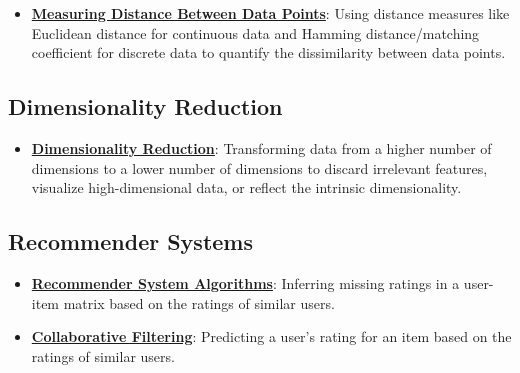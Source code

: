 \documentclass{article}%
\begin{document}
\begin{itemize}[leftmargin=*]
\item \href{https://purdue.brightspace.com/d2l/common/assets/pdfjs-d2l-dist/1.0.14-legacy/web/viewer.html?file=\%2Fcontent\%2Fenforced\%2F1095467-wl.202510.CS.24300.001\%2F12L2-distance-clusters.pdf\%3Fou\%3D1095467\&lang=en-us\&container=d2l-fileviewer-rendered-pdf\&fullscreen=d2l-fileviewer-rendered-pdf-dialog\&height=667#page=17}{\textbf{Measuring Distance Between Data Points}}: Using distance measures like Euclidean distance for continuous data and Hamming distance/matching coefficient for discrete data to quantify the dissimilarity between data points.%
\end{itemize}

%
\subsection{Dimensionality Reduction}%
\label{subsec:DimensionalityReduction}%
\begin{itemize}[leftmargin=*]%
\item \href{https://purdue.brightspace.com/d2l/common/assets/pdfjs-d2l-dist/1.0.14-legacy/web/viewer.html?file=\%2Fcontent\%2Fenforced\%2F1095467-wl.202510.CS.24300.001\%2F11L2-svd-pca-recommender.pdf\%3Fou\%3D1095467\&lang=en-us\&container=d2l-fileviewer-rendered-pdf\&fullscreen=d2l-fileviewer-rendered-pdf-dialog\&height=667#page=8}{\textbf{Dimensionality Reduction}}: Transforming data from a higher number of dimensions to a lower number of dimensions to discard irrelevant features, visualize high-dimensional data, or reflect the intrinsic dimensionality.%
\end{itemize}

%
\subsection{Recommender Systems}%
\label{subsec:RecommenderSystems}%
\begin{itemize}[leftmargin=*]%
\item \href{https://purdue.brightspace.com/d2l/common/assets/pdfjs-d2l-dist/1.0.14-legacy/web/viewer.html?file=\%2Fcontent\%2Fenforced\%2F1095467-wl.202510.CS.24300.001\%2F11L2-svd-pca-recommender.pdf\%3Fou\%3D1095467\&lang=en-us\&container=d2l-fileviewer-rendered-pdf\&fullscreen=d2l-fileviewer-rendered-pdf-dialog\&height=667#page=31}{\textbf{Recommender System Algorithms}}: Inferring missing ratings in a user-item matrix based on the ratings of similar users.%
\item \href{https://purdue.brightspace.com/d2l/common/assets/pdfjs-d2l-dist/1.0.14-legacy/web/viewer.html?file=\%2Fcontent\%2Fenforced\%2F1095467-wl.202510.CS.24300.001\%2F11L2-svd-pca-recommender.pdf\%3Fou\%3D1095467\&lang=en-us\&container=d2l-fileviewer-rendered-pdf\&fullscreen=d2l-fileviewer-rendered-pdf-dialog\&height=667#page=33}{\textbf{Collaborative Filtering}}: Predicting a user's rating for an item based on the ratings of similar users.%
\end{itemize}
\end{document}
